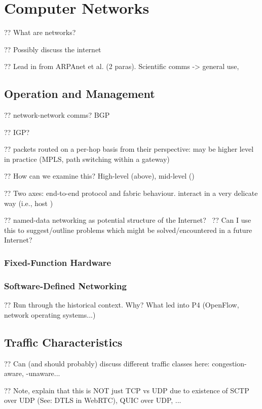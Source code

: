\chapter{Computer Networks}

?? What are networks?

?? Possibly discuss the internet

?? Lead in from ARPAnet et al. (2 paras). Scientific comms -> general use,

\section{Operation and Management}

?? network-network comms? BGP

?? IGP?

?? packets routed on a per-hop basis from their perspective: may be higher level in practice (MPLS, path switching within a gateway)

?? How can we examine this? High-level (above), mid-level ()

?? Two axes: end-to-end protocol and fabric behaviour. interact in a very delicate way (i.e., host )

?? named-data networking as potential structure of the Internet?~\parencite{DBLP:journals/ccr/0001ABJcCPWZ14}
?? Can I use this to suggest/outline problems which might be solved/encountered in a future Internet?

\subsection{Fixed-Function Hardware}

\subsection{Software-Defined Networking}

?? Run through the historical context. Why? What led into P4 (OpenFlow, network operating systems...)

\section{Traffic Characteristics}

?? Can (and should probably) discuss different traffic classes here: congestion-aware, -unaware...

?? Note, explain that this is NOT just TCP vs UDP due to existence of SCTP over UDP (See: DTLS in WebRTC), QUIC over UDP, ...

